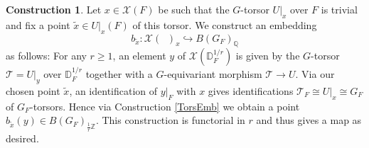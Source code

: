 \documentclass{article}
\newcommand{\BQ}{{\mathbb{Q}}}
\newcommand{\BZ}{{\mathbb{Z}}}
\newcommand{\CT}{{\mathcal T}}
\newcommand{\CX}{{\mathcal X}}
\newcommand{\Dr}[1][r]{\mathbb{D}_F^{1/#1}}
\DeclareMathOperator{\Dinfty}{\mathbb{D}_F^{1/\infty}}
\let\into\hookrightarrow
\theoremstyle{definition}
\newtheorem{construction}[definition]{Construction}
\theoremstyle{plain}
\begin{document}
\begin{construction} \label{EmbCons}
    Let $x \in \CX(F)$ be such that the $G$-torsor $U|_x$ over $F$ is trivial and fix a point $\tilde x \in U|_x(F)$ of this torsor. We construct an embedding
    \begin{equation*}
        b_{\tilde x}\colon \CX(\Dinfty)_x \into B(G_F)_\BQ
    \end{equation*}
    as follows: For any $r \geq 1$, an element $y$ of $\CX(\Dr)$ is given by the $G$-torsor $\CT=U|_y$ over $\Dr$ together with a $G$-equivariant morphism $\CT \to U$. Via our chosen point $\tilde x$, an identification of $y|_F$ with $x$ gives identifications $\CT_F \cong U|_x \cong G_F$ of $G_F$-torsors. Hence via Construction \ref{TorsEmb} we obtain a point $b_{\tilde x}(y) \in B(G_F)_{\frac{1}{r}\BZ}$. This construction is functorial in $r$ and thus gives a map as desired.
\end{construction}
\end{document}
